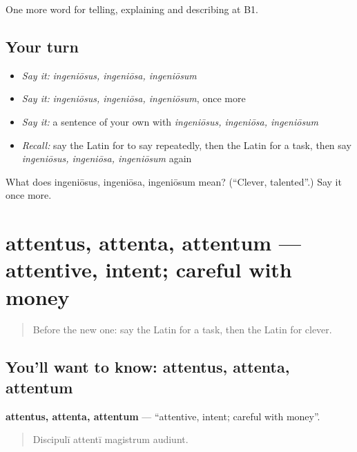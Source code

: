 \begin{grammarlens}[title={What you've built}]
One more word for telling, explaining and describing at B1.
\end{grammarlens}

\subsection*{Your turn}
\begin{itemize}
\raggedright
  \item \emph{Say it:} \emph{ingeniōsus, ingeniōsa, ingeniōsum}
  \item \emph{Say it:} \emph{ingeniōsus, ingeniōsa, ingeniōsum}, once more
  \item \emph{Say it:} a sentence of your own with \emph{ingeniōsus, ingeniōsa, ingeniōsum}
  \item \emph{Recall:} say the Latin for to say repeatedly, then the Latin for a task, then say \emph{ingeniōsus, ingeniōsa, ingeniōsum} again
\end{itemize}

\begin{tcolorbox}[breakable,colback=teal!4,colframe=teal!35!black,title={Before you move on}]
What does ingeniōsus, ingeniōsa, ingeniōsum mean? (\textquotedblleft{}Clever, talented\textquotedblright{}.) Say it once more.
\end{tcolorbox}
\section[attentus, attenta, attentum]{attentus, attenta, attentum — attentive, intent; careful with money}

\label{lesson:LA-C406-attentus}



\begin{quote}
Before the new one: say the Latin for a task, then the Latin for clever.
\end{quote}

\subsection*{You'll want to know: attentus, attenta, attentum}
\textbf{attentus, attenta, attentum} — \textquotedblleft{}attentive, intent; careful with money\textquotedblright{}.

\begin{quote}
Discipulī attentī magistrum audiunt.
\end{quote}

